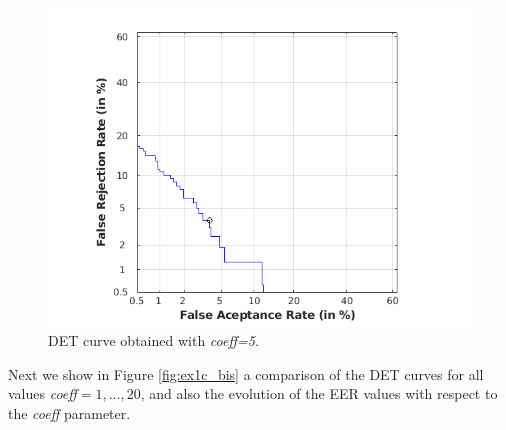 \documentclass[11pt]{article}
\begin{document}
\begin{figure}[h!]
  \centering
    \includegraphics[scale=0.65]{img/1c_det}
    \caption{DET curve obtained with \textit{coeff=5}.}
    \label{fig:ex1c}
\end{figure}

Next we show in Figure \ref{fig:ex1c_bis} a comparison of the DET curves for all values \textit{coeff}$=1,\dots,20$, and also the evolution of the EER values with respect to the \textit{coeff} parameter.
\end{document}
